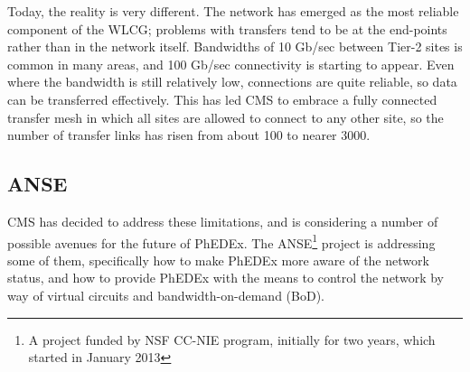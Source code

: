 Today, the reality is very different. The network has emerged as the most reliable 
component of the WLCG; problems with transfers tend to be at the end-points rather 
than in the network itself. Bandwidths of 10 Gb/sec between Tier-2 sites is common 
in many areas, and 100 Gb/sec connectivity is starting to appear. Even where the 
bandwidth is still relatively low, connections are quite reliable, so data can be 
transferred effectively. This has led CMS to embrace a fully connected transfer mesh 
in which all sites are allowed to connect to any other site, so the number of transfer 
links has risen from about 100 to nearer 3000.

\subsection{ANSE}

CMS has decided to address these limitations, and is considering a number of possible
 avenues for the future of PhEDEx\cite{TW_DB_CHEP13}. The ANSE\footnote{A project 
 funded by NSF CC-NIE program, initially for two years, which started in January 2013}
 \cite{ANSE} project is addressing some of them, specifically how to make PhEDEx more 
 aware of the network status, and how to provide PhEDEx with the means to control the 
 network by way of virtual circuits and bandwidth-on-demand (BoD).